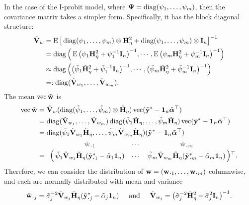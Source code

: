 In the case of the I-probit model, where ${\bm\Psi} = \operatorname{diag}(\psi_1,\dots,\psi_m)$, then the covariance matrix takes a simpler form.
Specifically, it has the block diagonal structure:
\begin{align*}
  \tilde{{\mathbf V}}_w
  &= \operatorname{E} \big[\operatorname{diag}(\psi_1,\dots,\psi_m) \otimes {\mathbf H}_\eta^2 + \operatorname{diag}(\psi_1,\dots,\psi_m) \otimes {\mathbf I}_n \big]^{-1} \\
  &= \operatorname{diag}\Big(
  \operatorname{E}\big( \psi_1{\mathbf H}_\eta^2 + \psi_1^{-1}{\mathbf I}_n\big)^{-1},
  \cdots,
  \operatorname{E}\big(\psi_m{\mathbf H}_\eta^2 + \psi_m^{-1}{\mathbf I}_n\big)^{-1}
  \Big) \\
  &\approx \operatorname{diag}\Big(
  \big( \tilde\psi_1\tilde{{\mathbf H}}_\eta^2 + \tilde\psi_1^{-1}{\mathbf I}_n\big)^{-1},
  \cdots,
  \big(\tilde\psi_m\tilde{{\mathbf H}}_\eta^2 + \tilde\psi_m^{-1}{\mathbf I}_n\big)^{-1}
  \Big) \\
  &=: \operatorname{diag}(\tilde{{\mathbf V}}_{w_1},\dots,\tilde{{\mathbf V}}_{w_m}).
  \end{align*}
The mean $\operatorname{vec} \tilde{{\mathbf w}}$ is
\begin{align*}
  \vecc \tilde\bw 
  &= \tilde\bV_w (\diag(\tilde\psi_1,\dots,\tilde\psi_m) \otimes \tilde\bH_\eta) \vecc(\tilde\by^* - \bone_n\tilde\balpha^\top) \\
  &= \diag(\tilde\bV_{w_1},\dots,\tilde\bV_{w_m})
  \diag(\tilde\psi_1\tilde\bH_\eta,\dots,\tilde\psi_m\tilde\bH_\eta)  
  \vecc(\tilde\by^* - \bone_n\tilde\balpha^\top) \\
  &= \diag(\tilde\psi_1\tilde\bV_{w_1}\tilde\bH_\eta,\dots,\tilde\psi_m\tilde\bV_{w_m}\tilde\bH_\eta)  
  (\tilde\by^* - \bone_n\tilde\balpha^\top) \\
  &= 
  \bordermatrix{
  &\color{gray}\tilde\bw_{\bigcdot 1} 
  &\color{gray}\cdots 
  &\color{gray}\tilde\bw_{\bigcdot m} \cr
  &\tilde\psi_1\tilde\bV_{w_{1}}\tilde\bH_\eta(\tilde\by^*_{\bigcdot 1} - \tilde\alpha_1\bone_n)      
  &\cdots 
  &\tilde\psi_m\tilde\bV_{w_{m}}\tilde\bH_\eta(\tilde\by^*_{\bigcdot m} - \tilde\alpha_m\bone_n) 
  }{}^\top.
\end{align*}
Therefore, we can consider the distribution of $\bw = (\bw_{\bigcdot 1},\dots,\bw_{\bigcdot m})$ columnwise, and each are normally distributed with mean and variance
\[
  \tilde\bw_{\bigcdot j} = \tilde\sigma_j^{-2}\tilde\bV_{w_{j}}\tilde\bH_\eta(\tilde\by^*_{\bigcdot j} - \tilde\alpha_j\bone_n) 
  \hspace{0.5cm}\text{and}\hspace{0.5cm}
  \tilde\bV_{w_{j}} = \big(\tilde\sigma_j^{-2}\tilde\bH_\eta^2 + \tilde\sigma_j^2\bI_n\big)^{-1}.
\]

